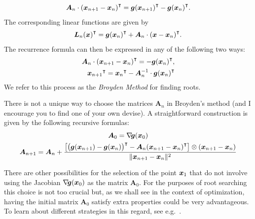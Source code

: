 \begin{equation}\label{equation:SecantProperty}
\boldsymbol{A}_n \cdot {(\boldsymbol{x}_{n+1} - \boldsymbol{x}_n)}^\intercal = {\boldsymbol{g}(\boldsymbol{x}_{n+1})}^\intercal - {\boldsymbol{g}(\boldsymbol{x}_n)}^\intercal.
\end{equation}
The corresponding linear functions are given by 
\begin{equation*}
{\boldsymbol{L}_n (\boldsymbol{x})}^\intercal = {\boldsymbol{g}(\boldsymbol{x}_n)}^\intercal + \boldsymbol{A}_n \cdot {(\boldsymbol{x}- \boldsymbol{x}_n)}^\intercal.
\end{equation*}
The recurrence formula can then be expressed in any of the following two ways:
\begin{equation}
\begin{split}
\boldsymbol{A}_n \cdot {(\boldsymbol{x}_{n+1} - \boldsymbol{x}_n )}^\intercal = -{\boldsymbol{g}(\boldsymbol{x}_n)}^\intercal, \\
{\boldsymbol{x}_{n+1}}^\intercal = {\boldsymbol{x}_n}^\intercal - \boldsymbol{A}_n^{-1} \cdot {\boldsymbol{g}(\boldsymbol{x}_n)}^\intercal
\end{split}
\end{equation}
We refer to this process as the \emph{Broyden Method} for finding roots.

\begin{remark}
There is not a unique way to choose the matrices $\boldsymbol{A}_n$ in Broyden's method (and I encourage you to find one of your own devise).  A straightforward construction is given by the following recursive formulas:
\begin{gather}\index{Broyden method!recursive formula}\index{Broyden method!iteration}
\boldsymbol{A}_0 = \gradient{\boldsymbol{g}}(\x_0) \nonumber \\
\boldsymbol{A}_{n+1} = \boldsymbol{A}_n + \frac{\big[ \transpose{\big(\boldsymbol{g}(\x_{n+1})-\boldsymbol{g}(\x_n)\big)} - \boldsymbol{A}_n \transpose{(\x_{n+1}-\x_n)} \big] \otimes (\x_{n+1} -\x_n)}{\norm{\x_{n+1}-\x_n}^2} \label{equation:Broyden}
\end{gather}
\end{remark}

\begin{remark}
There are other possibilities for the selection of the point $\boldsymbol{x}_1$ that do not involve using the Jacobian $\mathop{\nabla\! {\boldsymbol{g}}}(\boldsymbol{x}_0)$ as the matrix $\boldsymbol{A}_0$.  For the purposes of root searching this choice is not too crucial but, as we shall see in the context of optimization, having the initial matrix $\boldsymbol{A}_0$ satisfy extra properties could be very advantageous.  To learn about different strategies in this regard, see e.g.~\cite[chapter 8]{dennis1996numerical}.
\end{remark}

